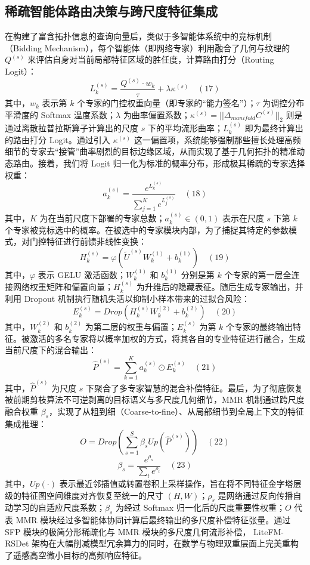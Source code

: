 \subsection{稀疏智能体路由决策与跨尺度特征集成}
在构建了富含拓扑信息的查询向量后，类似于多智能体系统中的竞标机制（Bidding Mechanism），每个智能体（即网络专家）利用融合了几何与纹理的 $Q^{(s)}$ 来评估自身对当前局部特征区域的胜任度，计算路由打分（Routing Logit）：$$L_k^{(s)} = \frac{Q^{(s)} \cdot w_k}{\tau} + \lambda \kappa^{(s)} \quad (17)$$其中，$w_k$ 表示第 $k$ 个专家的门控权重向量（即专家的“能力签名”）；$\tau$ 为调控分布平滑度的 Softmax 温度系数；$\lambda$ 为曲率偏置系数；$\kappa^{(s)} = ||\Delta_{manifold}C^{(s)}||_2$ 则是通过离散拉普拉斯算子计算出的尺度 $s$ 下的平均流形曲率；$L_k^{(s)}$ 即为最终计算出的路由打分 Logit。通过引入 $\kappa^{(s)}$ 这一偏置项，系统能够强制那些擅长处理高频细节的专家去“接管”曲率剧烈的目标边缘区域，从而实现了基于几何拓扑的精准动态路由。接着，我们将 Logit 归一化为标准的概率分布，形成极其稀疏的专家选择权重：$$a_k^{(s)} = \frac{e^{L_k^{(s)}}}{\sum_{j=1}^K e^{L_j^{(s)}}} \quad (18)$$其中，$K$ 为在当前尺度下部署的专家总数；$a_k^{(s)} \in (0, 1)$ 表示在尺度 $s$ 下第 $k$ 个专家被竞标选中的概率。在被选中的专家模块内部，为了捕捉其特定的参数模式，对门控特征进行前馈非线性变换：$$H_k^{(s)} = \varphi(\tilde{U}^{(s)} W_k^{(1)} + b_k^{(1)}) \quad (19)$$其中，$\varphi$ 表示 GELU 激活函数；$W_k^{(1)}$ 和 $b_k^{(1)}$ 分别是第 $k$ 个专家的第一层全连接网络权重矩阵和偏置向量；$H_k^{(s)}$ 为升维后的隐藏表征。随后生成专家输出，并利用 Dropout 机制执行随机失活以抑制小样本带来的过拟合风险：$$E_k^{(s)} = Drop(H_k^{(s)} W_k^{(2)} + b_k^{(2)}) \quad (20)$$其中，$W_k^{(2)}$ 和 $b_k^{(2)}$ 为第二层的权重与偏置；$E_k^{(s)}$ 为第 $k$ 个专家的最终输出特征。被激活的多名专家将以概率加权的方式，将其各自的专业特征进行融合，生成当前尺度下的混合输出：$$\hat{P}^{(s)} = \sum_{k=1}^K a_k^{(s)} \odot E_k^{(s)} \quad (21)$$其中，$\hat{P}^{(s)}$ 为尺度 $s$ 下聚合了多专家智慧的混合补偿特征。最后，为了彻底恢复被前期剪枝算法不可逆剥离的目标语义与多尺度几何细节，MMR 机制通过跨尺度融合权重 $\beta_s$，实现了从粗到细（Coarse-to-fine）、从局部细节到全局上下文的特征集成推理：$$O = Drop\left(\sum_{s=1}^S \beta_s Up(\hat{P}^{(s)})\right) \quad (22)$$$$\beta_s = \frac{e^{\rho_s}}{\sum_t e^{\rho_t}} \quad (23)$$其中，$Up(\cdot)$ 表示最近邻插值或转置卷积上采样操作，旨在将不同特征金字塔层级的特征图空间维度对齐恢复至统一的尺寸 $(H, W)$；$\rho_s$ 是网络通过反向传播自动学习的自适应尺度系数；$\beta_s$ 为经过 Softmax 归一化后的尺度重要性权重；$O$ 代表 MMR 模块经过多智能体协同计算后最终输出的多尺度补偿特征张量。通过 SFP 模块的极简分形稀疏化与 MMR 模块的多尺度几何流形补偿， LiteFM-RSDet 架构在大幅削减模型冗余算力的同时，在数学与物理双重层面上完美重构了遥感高空微小目标的高频响应特征。

